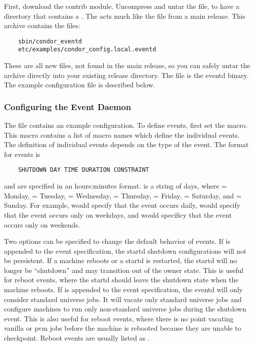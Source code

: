 First, download the  contrib module.
Uncompress and untar the file, to have a directory that
contains a .
The  acts much like the  file from
a main release.
This archive contains the files:
\begin{verbatim}
	sbin/condor_eventd
	etc/examples/condor_config.local.eventd
\end{verbatim}
These are all new files, not found in the main release, so you can
safely untar the archive directly into your existing release
directory.
The file  is the eventd binary.
The example configuration file is described below.

\subsubsection{\label{sec:EventD-Configuration}
Configuring the Event Daemon} 

The file  contains an
example configuration.
To define events, first set the  macro.
This macro contains a list of macro names which define the individual
events.
The definition of individual events depends on the type of the event.
The format for  events is
\begin{verbatim}
	SHUTDOWN DAY TIME DURATION CONSTRAINT
\end{verbatim}
\verb@TIME@ and \verb@DURATION@ are specified in an hours:minutes
format.  \verb@DAY@ is a string of days, where \verb@M@ = Monday,
\verb@T@ = Tuesday, \verb@W@ = Wednesday, \verb@R@ = Thursday,
\verb@F@ = Friday, \verb@S@ = Saturday, and \verb@U@ = Sunday.  For
example, \verb@MTWRFSU@ would specify that the event occurs daily,
\verb@MTWRF@ would specify that the event occurs only on weekdays, and
\verb@SU@ would specificy that the event occurs only on weekends.

Two options can be specified to change the default behavior of
 events.
If  is appended to the  event
specification, the startd shutdown configurations will not be
persistent.  If a machine reboots or a startd is restarted, the startd
will no longer be ``shutdown'' and may transition out of the owner state.
This is useful for reboot events, where the startd should leave the
shutdown state when the machine reboots.
If  is appended to the  event
specification, the eventd will only consider standard universe jobs.
It will vacate only standard universe jobs and configure machines to
run only non-standard universe jobs during the shutdown event.
This is also useful for reboot events, where there is no point
vacating vanilla or pvm jobs before the machine is rebooted because
they are unable to checkpoint.
Reboot events are usually listed as .

